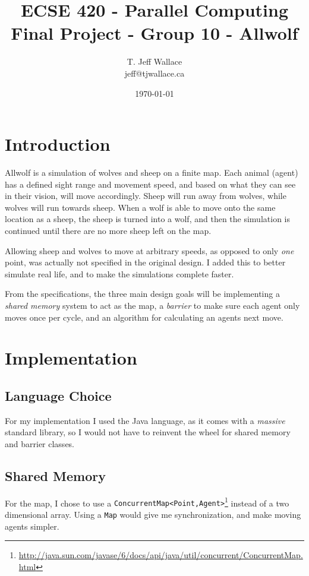 \documentclass[pdftex,10pt]{article}
\begin{document}
\title{{\sc ECSE 420 - Parallel Computing} \\ Final Project - Group 10 - Allwolf}
\author{T. Jeff Wallace \\ jeff@tjwallace.ca}
\date{\today}
\maketitle
\clearpage


\section{Introduction}\label{intro}
Allwolf is a simulation of wolves and sheep on a finite map.  Each animal (agent) has a defined sight range and movement speed, and based on what they can see in their vision, will move accordingly.  Sheep will run away from wolves, while wolves will run towards sheep.  When a wolf is able to move onto the same location as a sheep, the sheep is turned into a wolf, and then the simulation is continued until there are no more sheep left on the map.

Allowing sheep and wolves to move at arbitrary speeds, as opposed to only {\em one} point, was actually not specified in the original design.  I added this to better simulate real life, and to make the simulations complete faster.

From the specifications, the three main design goals will be implementing a {\em shared memory} system to act as the map, a {\em barrier} to make sure each agent only moves once per cycle, and an algorithm for calculating an agents next move.

\section{Implementation}\label{impl}
\subsection{Language Choice}\label{language}
For my implementation I used the Java language, as it comes with a {\em massive} standard library, so I would not have to reinvent the wheel for shared memory and barrier classes.

\subsection{Shared Memory}\label{sharedMemory}
For the map, I chose to use a {\tt ConcurrentMap<Point,Agent>}\footnote{\url{http://java.sun.com/javase/6/docs/api/java/util/concurrent/ConcurrentMap.html}} instead of a two dimensional array.  Using a {\tt Map} would give me synchronization, and make moving agents simpler.
\end{document}
